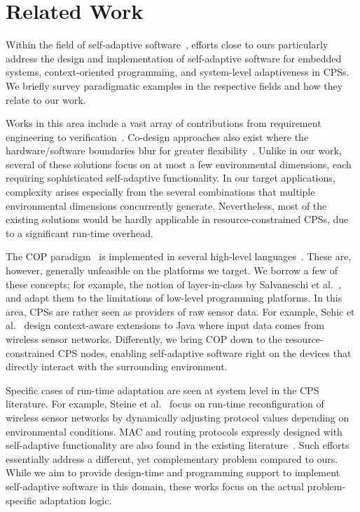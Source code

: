 \section{Related Work}
\label{sec:related}

Within the field of self-adaptive software~\cite{cheng:adaptive},
efforts close to ours particularly address the design and
implementation of self-adaptive software for embedded systems,
context-oriented programming, and system-level adaptiveness in
CPSs. We briefly survey paradigmatic examples in the respective fields
and how they relate to our work.

 Works in this area
include a vast array of contributions from requirement engineering to
verification~\cite{cheng:adaptive}. Co-design approaches also exist
where the hardware/software boundaries blur for greater
flexibility~\cite{diguet11:closed}. Unlike in our work, several of
these solutions focus on at most a few environmental dimensions, each
requiring sophisticated self-adaptive functionality. In our target
applications, complexity arises especially from the several
combinations that multiple environmental dimensions concurrently
generate. Nevertheless, most of the existing solutions would be hardly
applicable in resource-constrained CPSs, due to a significant
run-time overhead.

 The COP
paradigm~\cite{Hirschfeld08} is implemented in several high-level
languages~\cite{Kamina11,Ghezzi10,Bardram05,Sehic11,Salvaneschi12}. These
are, however, generally unfeasible on the platforms we target. We
borrow a few of these concepts; for example, the notion of
layer-in-class by Salvaneschi et al.~\cite{Salvaneschi12}, and adapt
them to the limitations of low-level programming platforms. In this
area, CPSs are rather seen as providers of raw sensor data. For
example, Sehic et al.~\cite{Sehic11} design context-aware extensions
to Java where input data comes from wireless sensor
networks. Differently, we bring COP down to the resource-constrained
CPS nodes, enabling self-adaptive software right on the devices that
directly interact with the surrounding environment.

 Specific cases of run-time
adaptation are seen at system level in the CPS literature. For
example, Steine et al.~\cite{Steine11} focus on run-time
reconfiguration of wireless sensor networks by dynamically adjusting
protocol values depending on environmental conditions. MAC and routing
protocols expressly designed with self-adaptive functionality are also
found in the existing literature~\cite{Park08,Bourdenas11}. Such
efforts essentially address a different, yet complementary problem
compared to ours. While we aim to provide design-time and programming
support to implement self-adaptive software in this domain, these
works focus on the actual problem-specific adaptation logic.


